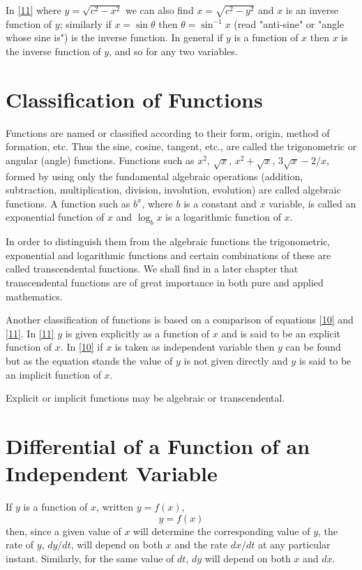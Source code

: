 In \eqref{11} where $y = \sqrt{c^2 - x^2}$ we can also find $x = \sqrt{c^2 - y^2}$ and
$x$ is an inverse function of $y$; similarly if $x = \sin \theta$ then $\theta = \sin^{-1} x$ (read "anti-sine" or "angle whose sine is") is the inverse function. In general if $y$ is a function of $x$ then $x$ is the inverse function of $y$, and so for any two variables.

\section{Classification of Functions}
Functions are named or classified according to their form, origin, method of formation, etc. Thus the sine, cosine, tangent, etc., are called the trigonometric or angular (angle) functions. Functions such as $x^2$, $\sqrt{x}$, $x^2 + \sqrt{x}$, $3\sqrt{x} - 2/x$, formed by using only the fundamental algebraic operations (addition, subtraction, multiplication, division, involution, evolution) are called algebraic functions. A function such as $b^x$, where $b$ is a constant and $x$ variable, is called an exponential function of $x$ and $\log_b x$ is a logarithmic function of $x$.

In order to distinguish them from the algebraic functions the trigonometric, exponential and logarithmic functions and certain combinations of these are called transcendental functions. We shall find in a later chapter that transcendental functions are of great importance in both pure and applied mathematics.

Another classification of functions is based on a comparison of equations \eqref{10} and \eqref{11}. In \eqref{11} $y$ is given explicitly as a function of $x$ and is said to be an explicit function of $x$. In \eqref{10} if $x$ is taken as independent variable then $y$ can be found but as the equation stands the value of $y$ is not given directly and $y$ is said to be an implicit function of $x$.

Explicit or implicit functions may be algebraic or transcendental.

\section{Differential of a Function of an Independent Variable}
If $y$ is a function of $x$, written $y = f(x)$,
\begin{equation}
\label{12}
y = f(x)
\tag{12}
\end{equation}
then, since a given value of $x$ will determine the corresponding value of $y$, the rate of $y$, $dy/dt$, will depend on both $x$ and the rate $dx/dt$ at any particular instant. Similarly, for the same value of $dt$, $dy$ will depend on both $x$ and $dx$.

